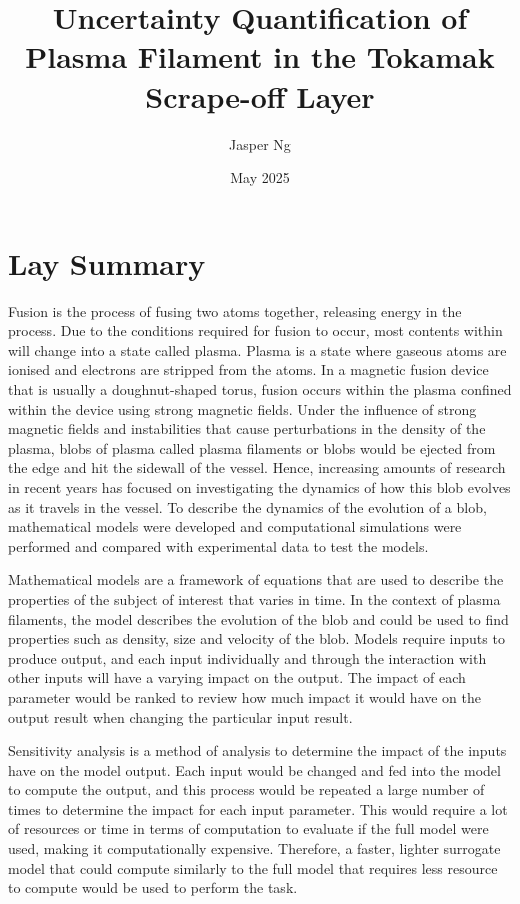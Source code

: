 \documentclass{article}
\title{\textbf{Uncertainty Quantification of Plasma Filament in the Tokamak Scrape-off Layer}}
\author{Jasper Ng}
\date{May 2025}
\begin{document}
\maketitle

\section*{Lay Summary}
Fusion is the process of fusing two atoms together, releasing energy in the process. Due to the conditions required for fusion to occur, most contents within will change into a state called plasma. Plasma is a state where gaseous atoms are ionised and electrons are stripped from the atoms. In a magnetic fusion device that is usually a doughnut-shaped torus, fusion occurs within the plasma confined within the device using strong magnetic fields. Under the influence of strong magnetic fields and instabilities that cause perturbations in the density of the plasma, blobs of plasma called plasma filaments or blobs would be ejected from the edge and hit the sidewall of the vessel. Hence, increasing amounts of research in recent years has focused on investigating the dynamics of how this blob evolves as it travels in the vessel. To describe the dynamics of the evolution of a blob, mathematical models were developed and computational simulations were performed and compared with experimental data to test the models.

Mathematical models are a framework of equations that are used to describe the properties of the subject of interest that varies in time. In the context of plasma filaments, the model describes the evolution of the blob and could be used to find properties such as density, size and velocity of the blob. Models require inputs to produce output, and each input individually and through the interaction with other inputs will have a varying impact on the output. The impact of each parameter would be ranked to review how much impact it would have on the output result when changing the particular input result.

Sensitivity analysis is a method of analysis to determine the impact of the inputs have on the model output. Each input would be changed and fed into the model to compute the output, and this process would be repeated a large number of times to determine the impact for each input parameter. This would require a lot of resources or time in terms of computation to evaluate if the full model were used, making it computationally expensive. Therefore, a faster, lighter surrogate model that could compute similarly to the full model that requires less resource to compute would be used to perform the task.
\end{document}
